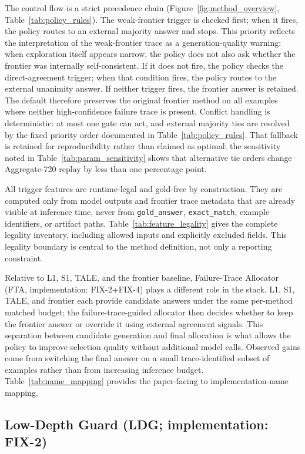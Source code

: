 The control flow is a strict precedence chain (Figure~\ref{fig:method_overview},
Table~\ref{tab:policy_rules}).
The weak-frontier trigger is checked first; when it fires, the policy routes to an
external majority answer and stops.
This priority reflects the interpretation of the weak-frontier trace as a
generation-quality warning: when exploration itself appears narrow, the policy
does not also ask whether the frontier was internally self-consistent.
If it does not fire, the policy checks the direct-agreement trigger; when that
condition fires, the policy routes to the external unanimity answer.
If neither trigger fires, the frontier answer is retained.
The default therefore preserves the original frontier method on all examples
where neither high-confidence failure trace is present.
Conflict handling is deterministic: at most one gate can act, and external
majority ties are resolved by the fixed priority order documented in
Table~\ref{tab:policy_rules}.
That fallback is retained for reproducibility rather than claimed as optimal;
the sensitivity noted in Table~\ref{tab:param_sensitivity} shows that alternative
tie orders change Aggregate-720 replay by less than one percentage point.

All trigger features are runtime-legal and gold-free by construction.
They are computed only from model outputs and frontier trace metadata that are
already visible at inference time, never from \texttt{gold\_answer},
\texttt{exact\_match}, example identifiers, or artifact paths.
Table~\ref{tab:feature_legality} gives the complete legality inventory, including
allowed inputs and explicitly excluded fields.
This legality boundary is central to the method definition, not only a reporting
constraint.

Relative to L1, S1, TALE, and the frontier baseline, Failure-Trace Allocator (FTA, implementation: FIX-2+FIX-4) plays a different
role in the stack.
L1, S1, TALE, and frontier each provide candidate answers under the same
per-method matched budget; the failure-trace-guided allocator then decides whether to keep the
frontier answer or override it using external agreement signals.
This separation between candidate generation and final allocation is what allows the
policy to improve selection quality without additional model calls.
Observed gains come from switching the final answer on a small trace-identified
subset of examples rather than from increasing inference budget.
Table~\ref{tab:name_mapping} provides the paper-facing to implementation-name mapping.

\subsection{Low-Depth Guard (LDG; implementation: FIX-2)}
\label{sec:fix2}

